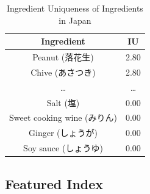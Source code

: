 \documentclass{sig-alternate}
\begin{document}
\begin{CJK}{UTF8}{min}
\begin{table}
\centering
\caption{Ingredient Uniqueness of Ingredients in Japan}
\begin{tabular}{|c|c|}
\hline

\textbf{Ingredient} &	 \textbf{IU} \\ \hline
Peanut (落花生) 		&	2.80 \\ \hline
Chive (あさつき) 		&	2.80 \\ \hline
\ldots 		&\ldots  \\ \hline
Salt (塩)			&	0.00 \\ \hline
Sweet cooking wine (みりん)		&	0.00 \\ \hline
Ginger (しょうが)		& 	0.00 \\ \hline
Soy sauce (しょうゆ)		&	0.00\\ \hline
\end{tabular}

\label{tab:IU}
\end{table} 
\end{CJK}


\subsection{Featured Index}
\end{document}
